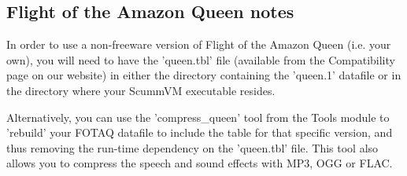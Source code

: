 \subsection{Flight of the Amazon Queen notes}
In order to use a non-freeware version of Flight of the Amazon Queen (i.e.
your own), you will need to have the 'queen.tbl' file (available from the
Compatibility page on our website) in either the directory containing the
'queen.1' datafile or in the directory where your ScummVM executable resides.
                  
Alternatively, you can use the 'compress\_queen' tool from the Tools module to
'rebuild' your FOTAQ datafile to include the table for that specific version,
and thus removing the run-time dependency on the 'queen.tbl' file. 
This tool also allows you to compress the speech and sound effects with MP3,
OGG or FLAC.
